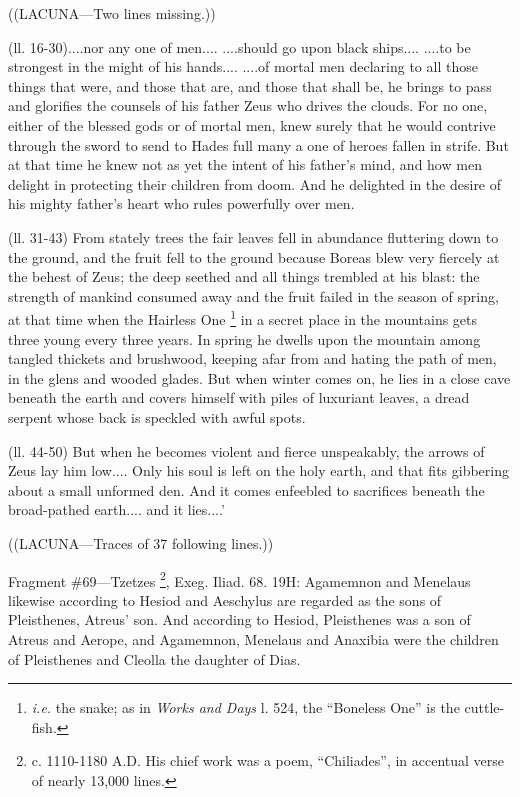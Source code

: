 ((LACUNA—Two lines missing.))

(ll. 16-30)....nor any one of men.... ....should go upon black ships.... ....to
be strongest in the might of his hands.... ....of mortal men declaring to all
those things that were, and those that are, and those that shall be, he brings
to pass and glorifies the counsels of his father Zeus who drives the clouds.
For no one, either of the blessed gods or of mortal men, knew surely that he
would contrive through the sword to send to Hades full many a one of heroes
fallen in strife. But at that time he knew not as yet the intent of his
father’s mind, and how men delight in protecting their children from
doom. And he delighted in the desire of his mighty father’s heart who
rules powerfully over men.

(ll. 31-43) From stately trees the fair leaves fell in abundance fluttering
down to the ground, and the fruit fell to the ground because Boreas blew very
fiercely at the behest of Zeus; the deep seethed and all things trembled at his
blast: the strength of mankind consumed away and the fruit failed in the season
of spring, at that time when the Hairless One \footnote{\emph{i.e.} the snake; as
in \emph{Works and Days} l. 524, the “Boneless One” is the
cuttle-fish.} in a
secret place in the mountains gets three young every three years. In spring he
dwells upon the mountain among tangled thickets and brushwood, keeping afar
from and hating the path of men, in the glens and wooded glades. But when
winter comes on, he lies in a close cave beneath the earth and covers himself
with piles of luxuriant leaves, a dread serpent whose back is speckled with
awful spots.

(ll. 44-50) But when he becomes violent and fierce unspeakably, the arrows of
Zeus lay him low.... Only his soul is left on the holy earth, and that fits
gibbering about a small unformed den. And it comes enfeebled to sacrifices
beneath the broad-pathed earth.... and it lies....’

((LACUNA—Traces of 37 following lines.))

Fragment \#69—Tzetzes \footnote{c. 1110-1180 A.D. His
chief work was a poem, “Chiliades”, in accentual verse of nearly
13,000 lines.}, Exeg. Iliad. 68. 19H: Agamemnon
and Menelaus likewise according to Hesiod and Aeschylus are regarded as the
sons of Pleisthenes, Atreus’ son. And according to Hesiod, Pleisthenes
was a son of Atreus and Aerope, and Agamemnon, Menelaus and Anaxibia were the
children of Pleisthenes and Cleolla the daughter of Dias.

